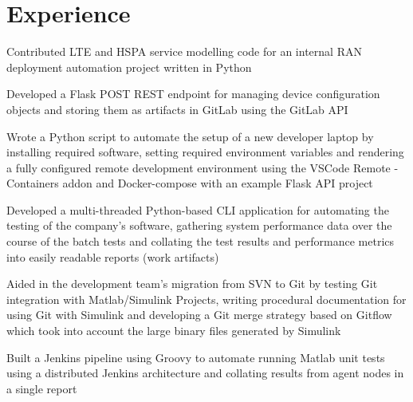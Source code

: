 \documentclass[letterpaper]{deedy-resume} %
\begin{document}
\begin{minipage}[t]{0.66\textwidth} %


\section{Experience}


\vspace{\topsep} %
\begin{tightitemize}
\item Contributed LTE and HSPA service modelling code for an internal RAN deployment automation project written in Python
\item Developed a Flask POST REST endpoint for managing device configuration objects and storing them as artifacts in GitLab using the GitLab API 
\item Wrote a Python script to automate the setup of a new developer laptop by installing required software, setting required environment variables and rendering a fully configured remote development environment using the VSCode Remote - Containers addon and Docker-compose with an example Flask API project
\end{tightitemize}

\sectionspace %



\begin{tightitemize}
\item Developed a multi-threaded Python-based CLI application for automating the testing of the company’s software, gathering system performance data over the course of the batch tests and collating the test results and performance metrics into easily readable reports (work artifacts)
\item Aided in the development team’s migration from SVN to Git by testing Git integration with Matlab/Simulink Projects, writing procedural documentation for using Git with Simulink and developing a Git merge strategy based on Gitflow which took into account the large binary files generated by Simulink
\item Built a Jenkins pipeline using Groovy to automate running Matlab unit tests using a distributed Jenkins architecture and collating results from agent nodes in a single report
\end{tightitemize}


\end{minipage}
\end{document}
